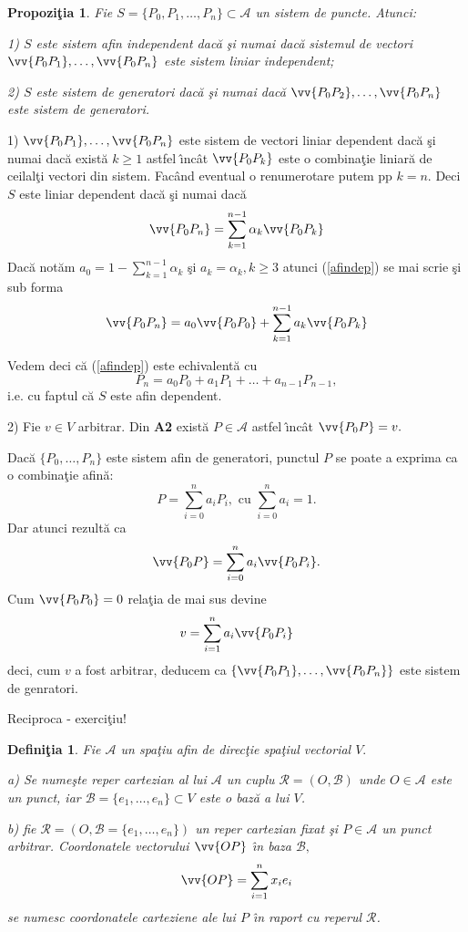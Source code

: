 \documentclass[12pt]{book}
\def\Ac{\mathcal A}
\def\Bc{\mathcal B}
\def\Rc{\mathcal R}
\def\ds{\displaystyle\sum}
\def\ai{ast\-fel \^{\i}n\-c\^at }
\def\noi{\noindent}
\def\Dem{\noindent{\bf Demonstra\c tie. }}
\def\ddc{da\-c\u a \c si nu\-mai da\-c\u a }
\newtheorem{defi}{Defini\c tia }
\newtheorem{prop}{Propozi\c tia }
\begin{document}
\begin{prop} Fie $S=\{P_0, P_1,\dots, P_n\} \subset \Ac$ un sistem de puncte. Atunci:

1) $S$ este sistem afin independent \ddc sistemul de vectori
$\vv{P_0P_1},\dots, \vv{P_0P_n}$ este sistem liniar independent;

2) $S$ este sistem de generatori \ddc $\vv{P_0P_2},\dots, \vv{P_0P_n}$ este sistem de generatori.


\end{prop}



\Dem

1) $\vv{P_0P_1},\dots,\vv{P_0P_n}$ este sistem de vectori liniar dependent \ddc  exist\u a $k\geq 1$ \ai $\vv{P_0P_k}$ este o combina\c tie liniar\u a de ceilal\c ti vectori din sistem. Fac\^and eventual o renumerotare putem pp $k=n.$ Deci $S$ este liniar dependent \ddc 
\begin{eqnarray}\label{afindep}
\vv{P_0P_n}=\sum_{k=1}^{n-1}\alpha_k\vv{P_0P_k}
\end{eqnarray}
Dac\u a not\u am $a_0=1-\ds_{k=1}^{n-1}\alpha_k$ \c si $a_k=\alpha_k, k\geq 3$  atunci (\ref{afindep}) se mai scrie \c si sub forma
\begin{eqnarray}\label{afindep1}
\vv{P_0P_n}=a_0\vv{P_0P_0}+\sum_{k=1}^{n-1}a_k\vv{P_0P_k}
\end{eqnarray}

 Vedem deci c\u a (\ref{afindep}) este echivalent\u a cu
$$P_n=a_0P_0+a_1P_1+\dots +a_{n-1}P_{n-1},$$ 
i.e. cu faptul c\u a $S$ este afin dependent.


2) Fie $v\in V$ arbitrar. Din {\bf A2} exist\u a $P\in \Ac$ \ai $\vv{P_0P}=v.$ 

\noi Dac\u a $\{P_0,\dots, P_n\}$ este sistem afin de generatori, punctul $P$ se poate a
exprima ca o combina\c tie afin\u a:
$$P=\sum_{i=0}^n a_iP_i, \text{ cu }\sum_{i=0}^n a_i=1.$$
Dar atunci rezult\u a ca 
$$\vv{P_0P}=\sum_{i=0}^n a_i\vv{P_0P_i}.$$
Cum $\vv{P_0P_0}=0$ rela\c tia de mai sus devine
$$v=\sum_{i=1}^n a_i\vv{P_0P_i}$$
deci, cum $v$ a fost arbitrar, deducem ca $\{\vv{P_0P_1}, \dots, \vv{P_0P_n}\}$ este sistem de genratori.

Reciproca - exerci\c tiu!



\begin{defi} Fie $\Ac$ un spa\c tiu afin de direc\c tie spa\c tiul vectorial $V.$ 

a) Se nume\c ste
reper cartezian al lui $\Ac$ un cuplu $\Rc=(O, \Bc)$ unde $O\in \Ac$ este un punct, iar $\Bc=\{e_1,\dots, e_n\}\subset V$ este o baz\u a a lui $V$.

b) fie $\Rc=\left( O, \Bc=\{e_1,\dots, e_n\}\right)$ un reper cartezian fixat \c si $P\in \Ac$ un punct arbitrar. Coordonatele  vectorului $\vv{OP}$ \^{\i}n baza $\Bc,$
$$\vv{OP}=\sum_{i=1}^nx_ie_i$$
se numesc {\em coordonatele carteziene ale lui $P$} \^{\i}n raport cu reperul $\Rc$.
\end{defi}
\end{document}
